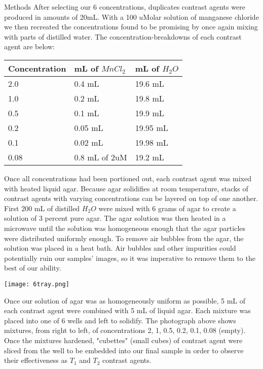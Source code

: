\documentclass[a4paper,12pt]{article}
\begin{document}
\begin{section}{Methods}
After selecting our 6 concentrations, duplicates contrast agents were produced in amounts of 20mL. With a 100 $u$Molar solution of manganese chloride we then recreated the concentrations found to be promising by once again mixing with parts of distilled water. The concentration-breakdowns of each contrast agent are below:

\begin{center}
    \begin{tabular}{ | l | l | p{2cm} |}
    \hline
    Concentration & mL of $MnCl_2$ & mL of $H_2O$ \\ \hline
    2.0 & 0.4 mL & 19.6 mL  \\ \hline
    1.0 & 0.2 mL & 19.8 mL \\ \hline
   0.5 & 0.1 mL & 19.9 mL \\ \hline
   0.2 & 0.05 mL & 19.95 mL \\ \hline
   0.1 & 0.02 mL & 19.98 mL \\ \hline
   0.08 & 0.8 mL of 2uM & 19.2 mL \\ \hline
    \end{tabular}
\end{center}

Once all concentrations had been portioned out, each contrast agent was mixed with heated liquid agar. Because agar solidifies at room temperature, stacks of contrast agents with varying concentrations can be layered on top of one another. First 200 mL of distilled $H_2 O$ were mixed with 6 grams of agar to create a solution of 3 percent pure agar. The agar solution was then heated in a microwave until the solution was homogeneous enough that the agar particles were distributed uniformly enough. To remove air bubbles from the agar, the solution was placed in a heat bath. Air bubbles and other impurities could potentially ruin our samples' images, so it was imperative to remove them to the best of our ability.\\

\begin{center}
\texttt{[image: 6tray.png]}
\end{center}

Once our solution of agar was as homogeneously uniform as possible, 5 mL of each contrast agent were combined with 5 mL of liquid agar. Each mixture was placed into one of 6 wells and left to solidify. The photograph above shows mixtures, from right to left, of concentrations 2, 1, 0.5, 0.2, 0.1, 0.08 (empty). Once the mixtures hardened, "cubettes" (small cubes) of contrast agent were sliced from the well to be embedded into our final sample in order to observe their effectiveness as $T_1$ and $T_2$ contrast agents.


\end{section}
\end{document}
